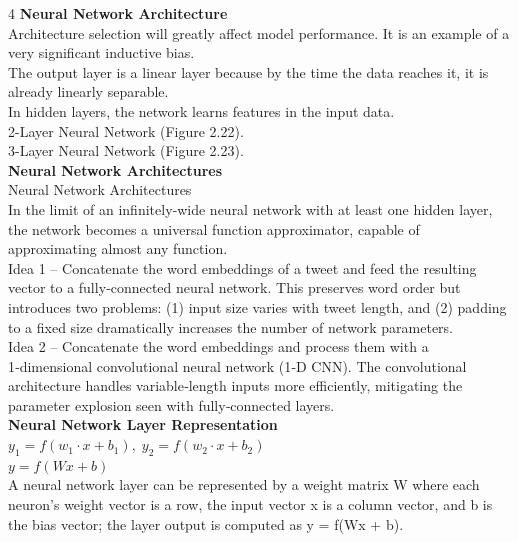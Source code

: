 \documentclass[8pt]{extarticle}
\begin{document}
\begin{multicols}{4}
\vspace{2pt}\textbf{Neural Network Architecture}\\
Architecture selection will greatly affect model performance. It is an example of a very significant inductive bias.\\
The output layer is a linear layer because by the time the data reaches it, it is already linearly separable.\\
In hidden layers, the network learns features in the input data.\\
2-Layer Neural Network (Figure 2.22).\\
3-Layer Neural Network (Figure 2.23).\\
\vspace{2pt}\textbf{Neural Network Architectures}\\
Neural Network Architectures\\
In the limit of an infinitely‑wide neural network with at least one hidden layer, the network becomes a universal function approximator, capable of approximating almost any function.\\
Idea 1 – Concatenate the word embeddings of a tweet and feed the resulting vector to a fully‑connected neural network. This preserves word order but introduces two problems: (1) input size varies with tweet length, and (2) padding to a fixed size dramatically increases the number of network parameters.\\
Idea 2 – Concatenate the word embeddings and process them with a 1‑dimensional convolutional neural network (1‑D CNN). The convolutional architecture handles variable‑length inputs more efficiently, mitigating the parameter explosion seen with fully‑connected layers.\\
\vspace{2pt}\textbf{Neural Network Layer Representation}\\
$y_{1} = f(w_{1} \cdot x + b_{1}),\; y_{2} = f(w_{2} \cdot x + b_{2})$\\
$y = f(Wx + b)$\\
A neural network layer can be represented by a weight matrix W where each neuron's weight vector is a row, the input vector x is a column vector, and b is the bias vector; the layer output is computed as y = f(Wx + b).\\


\end{multicols}
\end{document}

